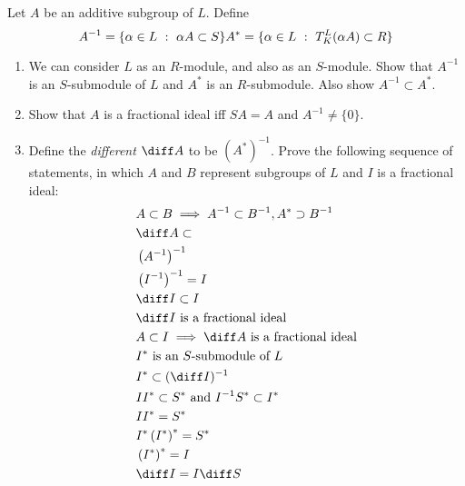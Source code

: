 \begin{problem}
Let \(A\) be an additive subgroup of \(L\). Define \[ A^{-1} = \{\alpha \in L \ : \ \alpha A \subset S\} \\ A^{\ast} = \{\alpha \in L \ : \ T_K^L(\alpha A) \subset R\}\]
\begin{enumerate}[label=(\alph*)]
    \item We can consider \(L\) as an \(R\)-module, and also as an \(S\)-module. Show that \(A^{-1}\) is an \(S\)-submodule of \(L\) and \(A^{\ast}\) is an \(R\)-submodule. Also show \(A^{-1} \subset A^{\ast}\).
    \item Show that \(A\) is a fractional ideal iff \(SA = A\) and \(A^{-1} \neq \{0\}\).
    \item Define the \textit{different} \(\diff A\) to be \(\left(A^{\ast}\right)^{-1}\). Prove the following sequence of statements, in which \(A\) and \(B\) represent subgroups of \(L\) and \(I\) is a fractional ideal:
    \begin{align*}
    & A \subset B \implies A^{-1} \subset B^{-1}, A^{\ast} \supset B^{-1} \\
    & \diff A \subset \\ & \left(A^{-1}\right)^{-1} \\
    & \left(I^{-1}\right)^{-1} = I \\
    & \diff I \subset I \\ 
    & \diff I \ \textrm{is a fractional ideal} \\
    & A \subset I \implies \diff A \  \textrm{is a fractional ideal} \\
    & I^{\ast} \ \textrm{is an }S\textrm{-submodule of} \ L \\
    & I^{\ast} \subset (\diff I)^{-1} \\
    & II^{\ast} \subset S^{\ast} \ \textrm{and} \ I^{-1}S^{\ast} \subset I^{\ast} \\
    & II^{\ast} =S^{\ast} \\
    & I^{\ast}\left(I^{\ast}\right)^{\ast}=S^{\ast} \\
    & \left(I^{\ast}\right)^{\ast} = I \\
    & \diff I = I \diff S
    \end{align*}
\end{enumerate}
\end{problem}